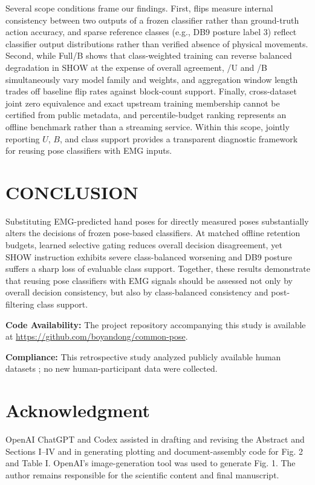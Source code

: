 \documentclass[conference,letterpaper]{IEEEtran}
\begin{document}
Several scope conditions frame our findings. First, flips measure internal consistency between two outputs of a frozen classifier rather than ground-truth action accuracy, and sparse reference classes (e.g., DB9 posture label 3) reflect classifier output distributions rather than verified absence of physical movements. Second, while \textrm{Full/B} shows that class-weighted training can reverse balanced degradation in SHOW at the expense of overall agreement, \textrm{/U} and \textrm{/B} simultaneously vary model family and weights, and aggregation window length trades off baseline flip rates against block-count support. \newpage
Finally, cross-dataset joint zero equivalence and exact upstream training membership cannot be certified from public metadata, and percentile-budget ranking represents an offline benchmark rather than a streaming service. Within this scope, jointly reporting $U$, $B$, and class support provides a transparent diagnostic framework for reusing pose classifiers with EMG inputs.

\section{CONCLUSION}

Substituting EMG-predicted hand poses for directly measured poses substantially alters the decisions of frozen pose-based classifiers. At matched offline retention budgets, learned selective gating reduces overall decision disagreement, yet SHOW instruction exhibits severe class-balanced worsening and DB9 posture suffers a sharp loss of evaluable class support. Together, these results demonstrate that reusing pose classifiers with EMG signals should be assessed not only by overall decision consistency, but also by class-balanced consistency and post-filtering class support.

\textbf{Code Availability:} The project repository accompanying this study is available at \url{https://github.com/boyandong/common-pose}.

\textbf{Compliance:} This retrospective study analyzed publicly available human datasets \cite{ref1,ref7,ref8,ref9,ref10}; no new human-participant data were collected.

\section*{Acknowledgment}
OpenAI ChatGPT and Codex assisted in drafting and revising the Abstract and Sections I--IV and in generating plotting and document-assembly code for Fig. 2 and Table I. OpenAI's image-generation tool was used to generate Fig. 1. The author remains responsible for the scientific content and final manuscript.
\end{document}
